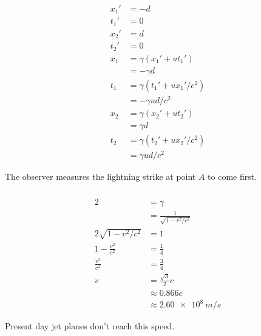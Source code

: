 \documentclass{article}
\begin{document}
\subsubsection{}

\begin{align*}
  x_1' & = -d                           \\
  t_1' & = 0                            \\
  x_2' & = d                            \\
  t_2' & = 0                            \\
  x_1  & = \gamma (x_1' + u t_1')       \\
       & = -\gamma d                    \\
  t_1  & = \gamma (t_1' + u x_1' / c^2) \\
       & = -\gamma u d / c^2            \\
  x_2  & = \gamma (x_2' + u t_2')       \\
       & = \gamma d                     \\
  t_2  & = \gamma (t_2' + u x_2' / c^2) \\
       & = \gamma u d / c^2
\end{align*}

The observer measures the lightning strike at point $A$ to come first.

\setcounter{subsubsection}{2}
\subsubsection{}

\begin{align*}
  2                      & = \gamma                         \\
                         & = \frac{1}{\sqrt{1 - v^2 / c^2}} \\
  2 \sqrt{1 - v^2 / c^2} & = 1                              \\
  1 - \frac{v^2}{c^2}    & = \frac{1}{4}                    \\
  \frac{v^2}{c^2}        & = \frac{3}{4}                    \\
  v                      & = \frac{\sqrt{3}}{2} c           \\
                         & \approx 0.866 c                  \\
                         & \approx \qty{2.60e8}{m/s}
\end{align*}

Present day jet planes don't reach this speed.
\end{document}
